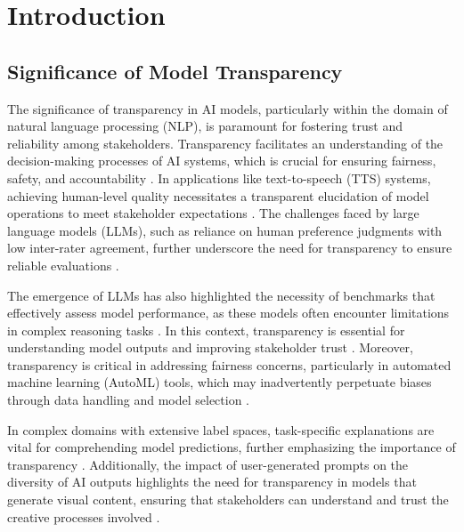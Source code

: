 \section{Introduction} \label{sec:Introduction}


\subsection{Significance of Model Transparency} \label{subsec:Significance of Model Transparency}



The significance of transparency in AI models, particularly within the domain of natural language processing (NLP), is paramount for fostering trust and reliability among stakeholders. Transparency facilitates an understanding of the decision-making processes of AI systems, which is crucial for ensuring fairness, safety, and accountability \cite{sen2018supervisingfeatureinfluence}. In applications like text-to-speech (TTS) systems, achieving human-level quality necessitates a transparent elucidation of model operations to meet stakeholder expectations \cite{tan2022naturalspeechendtoendtextspeech}. The challenges faced by large language models (LLMs), such as reliance on human preference judgments with low inter-rater agreement, further underscore the need for transparency to ensure reliable evaluations .



The emergence of LLMs has also highlighted the necessity of benchmarks that effectively assess model performance, as these models often encounter limitations in complex reasoning tasks . In this context, transparency is essential for understanding model outputs and improving stakeholder trust \cite{touvron2023llama}. Moreover, transparency is critical in addressing fairness concerns, particularly in automated machine learning (AutoML) tools, which may inadvertently perpetuate biases through data handling and model selection \cite{narayanan2023democratizecareneedfairness}.



In complex domains with extensive label spaces, task-specific explanations are vital for comprehending model predictions, further emphasizing the importance of transparency \cite{chiaburu2024copronnconceptbasedprototypicalnearest}. Additionally, the impact of user-generated prompts on the diversity of AI outputs highlights the need for transparency in models that generate visual content, ensuring that stakeholders can understand and trust the creative processes involved \cite{palmini2024patternscreativityuserinput}.



